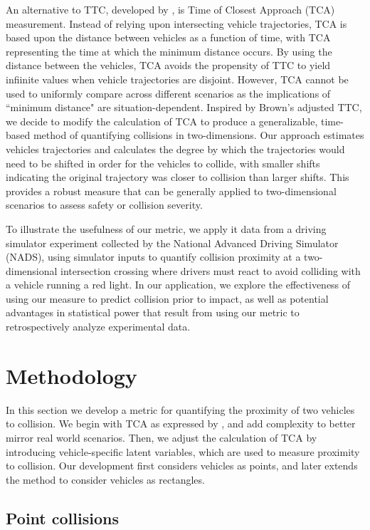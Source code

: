 \documentclass{article}
\begin{document}
An alternative to TTC, developed by \citet{Schwarz}, is Time of Closest Approach (TCA) measurement.  Instead of relying upon intersecting vehicle trajectories, TCA is based upon the distance between vehicles as a function of time, with TCA representing the time at which the minimum distance occurs. By using the distance between the vehicles, TCA avoids the propensity of TTC to yield infiinite values when vehicle trajectories are disjoint. However, TCA cannot be used to uniformly compare across different scenarios as the implications of ``minimum distance" are situation-dependent. Inspired by Brown's adjusted TTC, we decide to modify the calculation of TCA to produce a generalizable, time-based method of quantifying collisions in two-dimensions.  Our approach estimates vehicles trajectories and calculates the degree by which the trajectories would need to be shifted in order for the vehicles to collide, with smaller shifts indicating the original trajectory was closer to collision than larger shifts. This provides a robust measure that can be generally applied to two-dimensional scenarios to assess safety or collision severity.

To illustrate the usefulness of our metric, we apply it data from a driving simulator experiment collected by the National Advanced Driving Simulator (NADS), using simulator inputs to quantify collision proximity at a two-dimensional intersection crossing where drivers must react to avoid colliding with a vehicle running a red light.  In our application, we explore the effectiveness of using our measure to predict collision prior to impact, as well as potential advantages in statistical power that result from using our metric to retrospectively analyze experimental data.

\section{Methodology}

In this section we develop a metric for quantifying the proximity of two vehicles to collision. We begin with TCA as expressed by \citet{Schwarz}, and add complexity to better mirror real world scenarios. Then, we adjust the calculation of TCA by introducing vehicle-specific latent variables, which are used to measure proximity to collision.  Our development first considers vehicles as points, and later extends the method to consider vehicles as rectangles.

\subsection{Point collisions}
\end{document}
